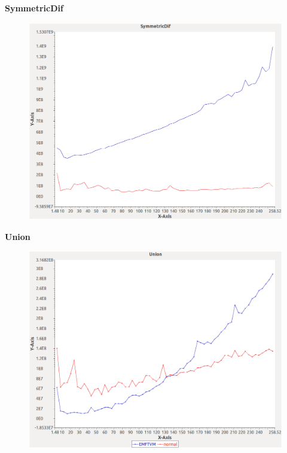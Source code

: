\noindent\textbf{SymmetricDif}

\begin{figure}[h]
\centering
\includegraphics[width=\textwidth]{../graphs/set/SymmetricDif}
\end{figure}
\pagebreak

\noindent\textbf{Union}

\begin{figure}[h]
\centering
\includegraphics[width=\textwidth]{../graphs/set/Union}
\end{figure}
\pagebreak